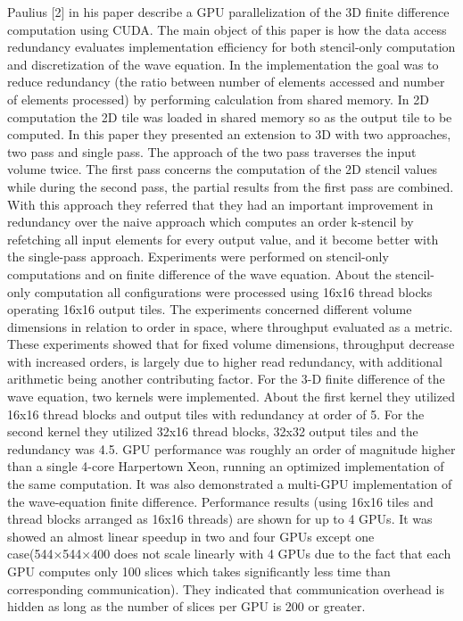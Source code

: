 Paulius [2] in his paper describe a GPU parallelization of the 3D finite difference computation using CUDA. The main object of this paper is how the data access redundancy evaluates implementation efficiency for both stencil-only computation and discretization of the wave equation. In the implementation the goal was to reduce redundancy (the ratio between number of elements accessed and number of elements processed) by performing calculation from shared memory. In 2D computation the 2D tile was loaded in shared memory so as the output tile to be computed. In this paper they presented an extension to 3D with two approaches, two pass and single pass. The approach of the two pass traverses the input volume twice. The first pass concerns the computation of the 2D stencil values while during the second pass, the partial results from the first pass are combined. With this approach they referred that they had an important improvement in redundancy over the naive approach which computes an order k-stencil by refetching all input elements for every output value, and it become better with the single-pass approach. Experiments were performed on stencil-only computations and on finite difference of the wave equation. About the stencil-only computation all configurations were processed using 16x16 thread blocks operating 16x16 output tiles. The experiments concerned different volume dimensions in relation to order in space, where throughput evaluated as a metric. These experiments showed that for fixed volume dimensions, throughput decrease with increased orders, is largely due to higher read redundancy, with additional arithmetic being another contributing factor. For the 3-D finite difference of the wave equation, two kernels were implemented. About the first kernel they utilized 16x16 thread blocks and output tiles with redundancy at order of 5. For the second kernel they utilized 32x16 thread blocks, 32x32 output tiles and the redundancy was 4.5. GPU performance was roughly an order of magnitude higher than a single 4-core Harpertown Xeon, running an optimized implementation of the same computation. It was also demonstrated a multi-GPU implementation of the wave-equation finite difference. Performance results (using 16x16 tiles and thread blocks arranged as 16x16 threads) are shown for up to 4 GPUs. It was showed an almost linear speedup in two and four GPUs except one case(544×544×400 does not scale linearly with 4 GPUs due to the fact that each GPU computes only 100 slices which takes significantly less time than corresponding communication). They indicated that communication overhead is hidden as long as the number of slices per GPU is 200 or greater.
